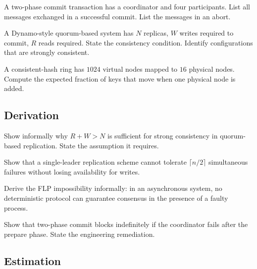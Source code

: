 \begin{exercise}
A two-phase commit transaction has a coordinator and four participants. List all messages exchanged in a successful commit. List the messages in an abort.
\end{exercise}

\begin{exercise}
A Dynamo-style quorum-based system has $N$ replicas, $W$ writes required to commit, $R$ reads required. State the consistency condition. Identify configurations that are strongly consistent.
\end{exercise}

\begin{exercise}
A consistent-hash ring has $1024$ virtual nodes mapped to $16$ physical nodes. Compute the expected fraction of keys that move when one physical node is added.
\end{exercise}

\subsection*{Derivation}

\begin{exercise}
Show informally why $R + W > N$ is sufficient for strong consistency in quorum-based replication. State the assumption it requires.
\end{exercise}

\begin{exercise}
Show that a single-leader replication scheme cannot tolerate $\lceil n/2 \rceil$ simultaneous failures without losing availability for writes.
\end{exercise}

\begin{exercise}
Derive the FLP impossibility informally: in an asynchronous system, no deterministic protocol can guarantee consensus in the presence of a faulty process.
\end{exercise}

\begin{exercise}
Show that two-phase commit blocks indefinitely if the coordinator fails after the prepare phase. State the engineering remediation.
\end{exercise}

\subsection*{Estimation}

